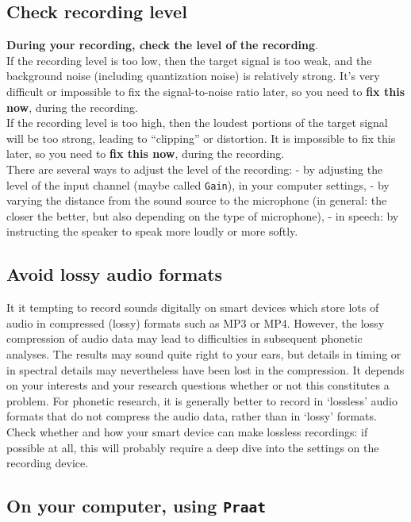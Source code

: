 \documentclass[
]{book}
\begin{document}
\subsection{Check recording level}\label{sec:recordinglevel}

\textbf{During your recording, check the level of the recording}.\\
If the recording level is too low, then the target signal is too weak, and the background noise (including quantization noise) is relatively strong. It's very difficult or impossible to fix the signal-to-noise ratio later, so you need to \textbf{fix this now}, during the recording.\\
If the recording level is too high, then the loudest portions of the target signal will be too strong, leading to ``clipping'' or distortion. It is impossible to fix this later, so you need to \textbf{fix this now}, during the recording.\\
There are several ways to adjust the level of the recording:
- by adjusting the level of the input channel (maybe called \texttt{Gain}), in your computer settings,
- by varying the distance from the sound source to the microphone (in general: the closer the better, but also depending on the type of microphone),
- in speech: by instructing the speaker to speak more loudly or more softly.

\subsection{Avoid lossy audio formats}\label{sec:avoidlossyformats}

It it tempting to record sounds digitally on smart devices which store lots of audio in compressed (lossy) formats such as MP3 or MP4. However, the lossy compression of audio data may lead to difficulties in subsequent phonetic analyses. The results may sound quite right to your ears, but details in timing or in spectral details may nevertheless have been lost in the compression. It depends on your interests and your research questions whether or not this constitutes a problem.
For phonetic research, it is generally better to record in `lossless' audio formats that do not compress the audio data, rather than in `lossy' formats. Check whether and how your smart device can make lossless recordings: if possible at all, this will probably require a deep dive into the settings on the recording device.

\subsection{\texorpdfstring{On your computer, using \texttt{Praat}}{On your computer, using Praat}}\label{on-your-computer-using-praat}
\end{document}
